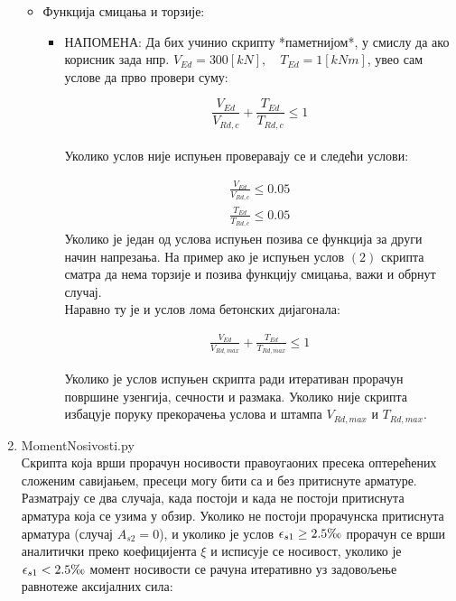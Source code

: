 \documentclass[11pt, a4paper]{article}
\begin{document}
\begin{enumerate}
\begin{itemize}
\begin{itemize}
		\end{itemize}
		\item Функција смицања и торзије:
		\begin{itemize}
			\item НАПОМЕНА: Да бих учинио скрипту *паметнијом*, у смислу да ако корисник зада нпр. $V_{Ed} = 300  [kN], \quad T_{Ed} = 1  [kNm]$, увео сам услове да прво провери суму:
		
			$$\frac{V_{Ed}}{V_{Rd,c}} + \frac{T_{Ed}}{T_{Rd,c}} \leq 1$$\\
			Уколико услов није испуњен проверавају се и следећи услови:
			
		\begin{align}
			\frac{V_{Ed}}{V_{Rd,c}} \leq 0.05\\
			\frac{T_{Ed}}{T_{Rd,c}} \leq 0.05
	\end{align}
	Уколико је један од услова испуњен позива се функција за други начин напрезања. На пример ако је испуњен услов $(2)$ скрипта сматра да нема торзије и позива функцију смицања, важи и обрнут случај.\\
	Наравно ту је и услов лома бетонских дијагонала:
		
		\begin{align*}
			\frac{V_{Ed}}{V_{Rd,max}} + \frac{T_{Ed}}{T_{Rd,max}} \leq 1
		\end{align*}

Уколико је услов испуњен скрипта ради итеративан прорачун површине узенгија, сечности и размака. Уколико није скрипта избацује поруку прекорачења услова и штампа $V_{Rd,max}$ и $T_{Rd, max}$.	
	
					 
		\end{itemize}
		
	\end{itemize}	
	
\item {\Large{MomentNosivosti.py}}\\[5mm]
Скрипта која врши прорачун носивости правоугаоних пресека оптерећених сложеним савијањем, пресеци могу бити са и без притиснуте арматуре.\\[2mm]
Разматрају се два случаја, када постоји и када не постоји притиснута арматура која се узима у обзир.
Уколико не постоји прорачунска притиснута арматура (случај $A_{s2}=0$), и уколико је услов $\epsilon_{s1} \geq 2.5 \perthousand$ прорачун се врши аналитички преко коефицијента $\xi$ и исписује се носивост, уколико је $\epsilon_{s1} < 2.5 \perthousand$ момент носивости се рачуна итеративно уз задовољење равнотеже аксијалних сила:


\end{enumerate}
\end{document}
